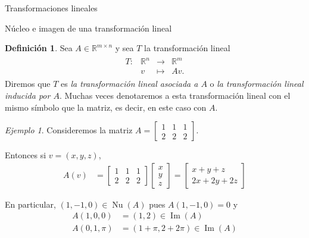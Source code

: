 \documentclass[a4paper,12pt,twoside,spanish,reqno]{amsbook}
\numberwithin{equation}{section}
\theoremstyle{definition}
\newtheorem{definicion}[teorema]{Definici\'on}
\theoremstyle{remark}
\newtheorem*{ejemplo*}{Ejemplo}
\newcommand\im{\operatorname{Im}}
\renewcommand\nu{\operatorname{Nu}}
\newcommand{\R}{\mathbb R}
\begin{document}
\begin{chapter}{Transformaciones lineales}
\begin{section}{Núcleo e imagen de una transformación lineal}
\begin{definicion}
    Sea $A\in\R^{m\times n}$ y sea $T$ la transformación lineal 
    \begin{align*}
        \begin{array}{rccc}
            T : &\R^n &\to &\R^m \\
                &v &\mapsto &Av.
        \end{array}
        \end{align*}
        Diremos que $T$  es \textit{la transformación lineal asociada a $A$} o  \textit{la transformación lineal inducida por $A$}. Muchas veces denotaremos a esta transformación lineal con el mismo símbolo que la matriz, es decir, en este caso con $A$.  
\end{definicion}



\begin{ejemplo*}
    Consideremos la matriz $A=\begin{bmatrix}   1&1&1\\   2&2&2 \end{bmatrix}$.
    

    
    Entonces si $v =(x,y,z)$, 
    \begin{align*}
    A(v) &= \begin{bmatrix} 1&1&1\\2&2&2 \end{bmatrix} \begin{bmatrix}  x\\y\\z \end{bmatrix}
    = \begin{bmatrix}  x+y+z\\2x+2y+2z \end{bmatrix}           
    \end{align*}
    

    
    En particular,
    $(1,-1,0)\in\nu(A)$ pues $A(1,-1,0)=0$ y
    \begin{align*}
    A(1,0,0)&=(1,2)\in\im(A)\\
    A(0,1,\pi)&=(1+\pi,2+2\pi)\in\im(A)
    \end{align*}
\end{ejemplo*}



\end{section}
\end{chapter}
\end{document}

